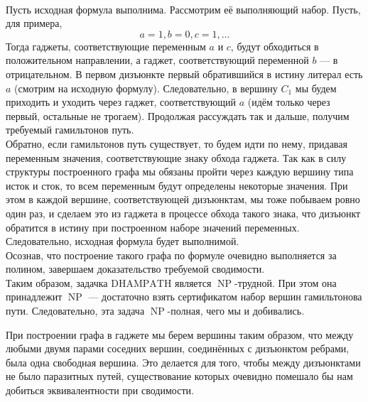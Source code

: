 \documentclass[11pt]{article}
\DeclareMathOperator{\NP}{NP}
\begin{document}
\\
Пусть исходная формула выполнима. Рассмотрим её выполняющий набор. Пусть, для примера, 
\[a = 1, b = 0, c = 1, \ldots\]
Тогда гаджеты, соответствующие переменным $a$ и $c$, будут обходиться в положительном направлении, а гаджет, соответствующий переменной $b$ --- в отрицательном. В первом дизъюнкте первый обратившийся в истину литерал есть $a$ (смотрим на исходную формулу). Следовательно, в вершину $C_1$ мы будем приходить и уходить через гаджет, соответствующий $a$ (идём только через первый, остальные не трогаем). Продолжая рассуждать так и дальше, получим требуемый гамильтонов путь. \\
Обратно, если гамильтонов путь существует, то будем идти по нему, придавая переменным значения, соответствующие знаку обхода гаджета. Так как в силу структуры построенного графа мы обязаны пройти через каждую вершину типа исток и сток, то всем переменным будут определены некоторые значения. При этом в каждой вершине, соответствующей дизъюнктам, мы тоже побываем ровно один раз, и сделаем это из гаджета в процессе обхода такого знака, что дизъюнкт обратится в истину при построенном наборе значений переменных. Следовательно, исходная формула будет выполнимой. \\
Осознав, что построение такого графа по формуле очевидно выполняется за полином, завершаем доказательство требуемой сводимости. \\
Таким образом, задачка $\text{DHAMPATH}$ является $\NP$-трудной. При этом она принадлежит $\NP$ --- достаточно взять сертификатом набор вершин гамильтонова пути. Следовательно, эта задача $\NP$-полная, чего мы и добивались.

\begin{remark}
    При построении графа в гаджете мы берем вершины таким образом, что между любыми двумя парами соседних вершин, соединённых с дизъюнктом ребрами, была одна свободная вершина. Это делается для того, чтобы между дизъюнктами не было паразитных путей, существование которых очевидно помешало бы нам добиться эквивалентности при сводимости.
\end{remark}
\end{document}
